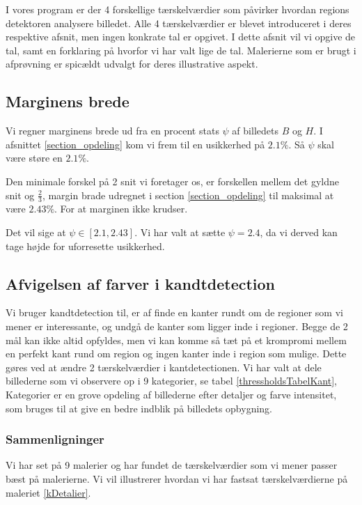 {\sffamily
I vores program er der 4 forskellige tærskelværdier som påvirker hvordan
regions detektoren analysere billedet. Alle 4 tærskelværdier er blevet
introduceret i deres respektive afsnit, men ingen konkrate tal er
opgivet. I dette afsnit vil vi opgive de tal, samt en forklaring på
hvorfor vi har valt lige de tal. Malerierne som er brugt i afprøvning er
spicældt udvalgt for deres illustrative aspekt. 
}

\subsection{Marginens brede}
Vi regner marginens brede ud fra en procent stats $\psi$ af billedets
$B$ og $H$. I afsnittet \ref{section_opdeling} kom vi frem til en
usikkerhed på $2.1 \%$. Så $\psi$ skal være støre en $2.1 \%$. 

Den minimale forskel på 2 snit vi foretager os, er forskellen mellem det
gyldne snit og $\frac{2}{3}$, margin brade udregnet i section
\ref{section_opdeling} til maksimal at være $2.43\%$. For at marginen
ikke krudser. 

Det vil sige at $\psi \in [2.1, 2.43]$. Vi har valt at
sætte $\psi = 2.4$, da vi derved kan tage højde for uforresette
usikkerhed.

\subsection{Afvigelsen af farver i kandtdetection}
Vi bruger kandtdetection til, er af finde en kanter rundt om de regioner
som vi mener er interessante, og undgå de kanter som ligger inde i
regioner. Begge de 2 mål kan ikke altid opfyldes, men vi kan komme så
tæt på et krompromi mellem en perfekt kant rund om region og ingen
kanter inde i region som mulige. Dette gøres ved at ændre 2
tærskelværdier i kantdetectionen. Vi har valt at dele billederne som vi
observere op i 9 kategorier, se tabel \ref{thressholdsTabelKant},
Kategorier er en grove opdeling af billederne efter detaljer og farve
intensitet, som bruges til at give en bedre indblik på billedets
opbygning. 

\subsubsection{Sammenligninger}
Vi har set på 9 malerier og har fundet de tærskelværdier som vi mener
passer bæst på malerierne. Vi vil illustrerer hvordan vi har fastsat
tærskelværdierne på maleriet \ref{kDetalier}.

